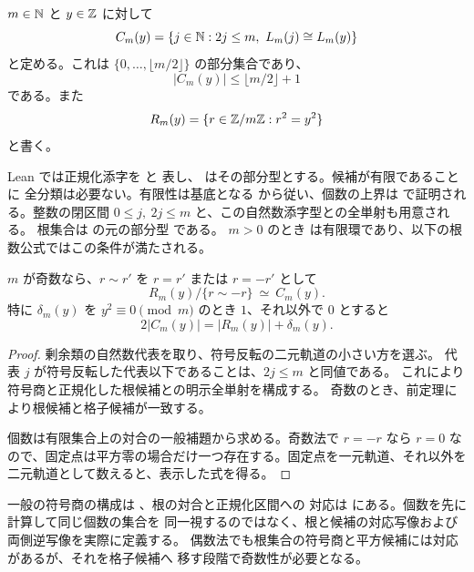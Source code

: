 \begin{definition}[有限正規化候補]
\label{bp:fiber-candidates}
\leanok
{}
$m\in\mathbb N$ と $y\in\mathbb Z$ に対して
\[
 C_m(y)=\{j\in\mathbb N:2j\le m,\ L_m(j)\cong L_m(y)\}
\]
と定める。これは $\{0,\ldots,\lfloor m/2\rfloor\}$ の部分集合であり、
\[
 |C_m(y)|\le\lfloor m/2\rfloor+1
\]
である。また
\[
 R_m(y)=\{r\in\mathbb Z/m\mathbb Z:r^2=y^2\}
\]
と書く。
\end{definition}

Lean では正規化添字を  と
表し、 はその部分型とする。候補が有限であることに
全分類は必要ない。有限性は基底となる  から従い、個数の上界は
 で証明される。整数の閉区間
$0\le j,\ 2j\le m$ と、この自然数添字型との全単射も用意される。
根集合は  の元の部分型  である。
$m>0$ のとき  は有限環であり、以下の根数公式ではこの条件が満たされる。

\begin{theorem}[根集合の符号商と正規化候補]
\label{bp:fiber-root-sign}
\leanok
{}
$m$ が奇数なら、$r\sim r'$ を $r=r'$ または $r=-r'$ として
\[
 R_m(y)/\{r\sim-r\}\ \simeq\ C_m(y).
\]
特に $\delta_m(y)$ を $y^2\equiv0\pmod m$ のとき $1$、それ以外で $0$ とすると
\[
 2|C_m(y)|=|R_m(y)|+\delta_m(y).
\]
\end{theorem}
\begin{proof}
\leanok
剰余類の自然数代表を取り、符号反転の二元軌道の小さい方を選ぶ。
代表 $j$ が符号反転した代表以下であることは、$2j\le m$ と同値である。
これにより符号商と正規化した根候補との明示全単射を構成する。
奇数のとき、前定理により根候補と格子候補が一致する。

個数は有限集合上の対合の一般補題から求める。奇数法で $r=-r$ なら $r=0$
なので、固定点は平方零の場合だけ一つ存在する。固定点を一元軌道、それ以外を
二元軌道として数えると、表示した式を得る。
\end{proof}

一般の符号商の構成は 、根の対合と正規化区間への
対応は  にある。個数を先に計算して同じ個数の集合を
同一視するのではなく、根と候補の対応写像および両側逆写像を実際に定義する。
偶数法でも根集合の符号商と平方候補には対応があるが、それを格子候補へ
移す段階で奇数性が必要となる。

